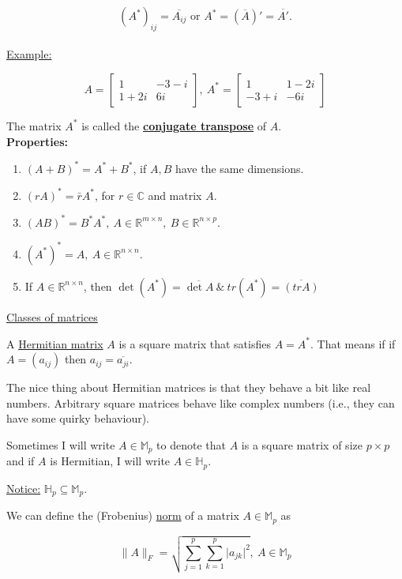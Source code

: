 \documentclass[twoside]{article}
\newcommand*\mean[1]{\bar{#1}}
\begin{document}
$$(A^*)_{ij}=\overline{A_{ij}}\text{ or } A^*=\left(\overline{A}\right)'=\overline{A'}.$$\\

\underline{Example:}

$$A=\begin{bmatrix}
	1 & -3-i\\
	1+2i & 6i
\end{bmatrix},\ A^*=\begin{bmatrix}
	1 & 1-2i\\
	-3+i & -6i
\end{bmatrix}$$

The matrix $A^*$ is called the \underline{\textbf{conjugate transpose}} of $A$.\\

\textbf{Properties:}

\begin{enumerate}
	\item $(A+B)^*=A^*+B^*$, if $A, B$ have the same dimensions.
	\item $(rA)^*=\mean{r}A^*$, for $r\in\mathbb{C}$ and matrix $A$.
	\item $(AB)^*=B^*A^*,\ A\in\mathbb{R}^{m\times n},\ B\in\mathbb{R}^{n\times p}$.
	\item $(A^*)^*=A,\ A\in\mathbb{R}^{n\times n}$.
	\item If $A\in\mathbb{R}^{n\times n}$, then $\det(A^*)=\overline{\det A}\ \&\ tr(A^*)=\overline{(trA)}$
\end{enumerate}

\underline{Classes of matrices}

A \underline{Hermitian matrix} $A$ is a square matrix that satisfies $A=A^*$. That means if if $A=(a_{ij})$ then $a_{ij}=\overline{a_{ji}}$.

The nice thing about Hermitian matrices is that they behave a bit like real numbers. Arbitrary square matrices behave like complex numbers (i.e., they can have some quirky behaviour).

Sometimes I will write $A\in \mathbb{M}_p$ to denote that $A$ is a square matrix of size $p\times p$ and if $A$ is Hermitian, I will write $A\in \mathbb{H}_p$.

\underline{Notice:} $\mathbb{H}_p\subseteq\mathbb{M}_p.$

We can define the (Frobenius) \underline{norm} of a matrix $A\in\mathbb{M}_p$ as

$$\lVert A\rVert_F=\sqrt{\sum^p_{j=1}\sum^p_{k=1}\lvert a_{jk}\rvert^2},\ A\in\mathbb{M}_p$$
\end{document}
